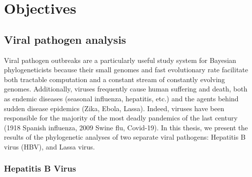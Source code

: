 \chapter{Objectives}\label{ch:objectives}

\section{Viral pathogen analysis}

Viral pathogen outbreaks are a particularly useful study system for Bayesian phylogeneticists because their small genomes and fast evolutionary rate facilitate both tractable computation and a constant stream of constantly evolving genomes.
Additionally, viruses frequently cause human suffering and death, both as endemic diseases (seasonal influenza, hepatitis, etc.) and the agents behind sudden disease epidemics (Zika, Ebola, Lassa).
Indeed, viruses have been responsible for the majority of the most deadly pandemics of the last century (1918 Spanish influenza, 2009 Swine flu, Covid-19).
In this thesis, we present the results of the phylogenetic analyses of two separate viral pathogens: Hepatitis B virus (HBV), and Lassa virus.

%

\subsection{Hepatitis B Virus}

